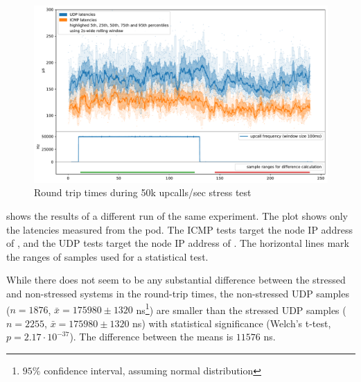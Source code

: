 \begin{figure}
    \centering
    \includegraphics[width=.9\linewidth]{img/packet_flood_50k_latency.pdf}
    \caption{Round trip times during 50k upcalls/sec stress test}
    \label{fig:plot-packet-flood-50k-latency}
\end{figure}

 shows the results of a different run of the same experiment. The plot shows only the latencies measured from the  pod. The ICMP tests target the node IP address of , and the UDP tests target the node IP address of . The horizontal lines mark the ranges of samples used for a statistical test.

While there does not seem to be any substantial difference between the stressed and non-stressed systems in the round-trip times, the non-stressed UDP samples ($n=1876$, $\bar{x}=175980 \pm 1320$ \si{\nano\second}\footnote{$95\%$ confidence interval, assuming normal distribution}) are smaller than the stressed UDP samples ($n=2255$, $\bar{x}=175980 \pm 1320$ \si{\nano\second}) with statistical significance (Welch's t-test, $p=2.17 \cdot 10^{-37}$). The difference between the means is $11576$ \si{\nano\second}.


